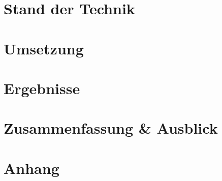 \documentclass[a4paper,12pt, twoside]{scrreprt}
\begin{document}
\chapter{Stand der Technik} %


\chapter{Umsetzung} %


\chapter{Ergebnisse}


\chapter{Zusammenfassung \& Ausblick}


	
	

%


\appendix
\chapter{Anhang}  %

\end{document}
